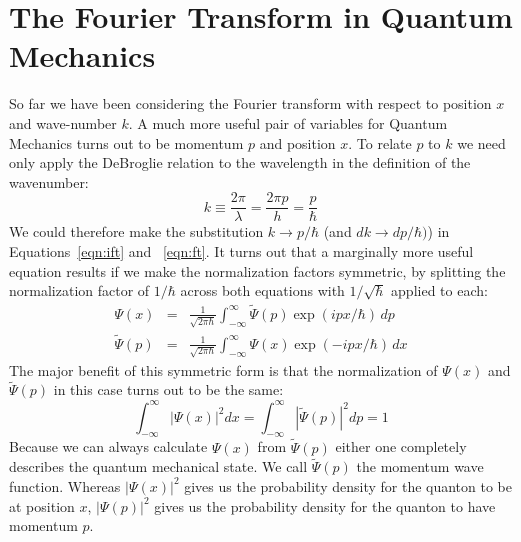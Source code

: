 \documentclass[12pt]{book}
\begin{document}
\section{The Fourier Transform in Quantum Mechanics}

So far we have been considering the Fourier transform with respect to position $x$ and wave-number $k$.  A much more useful pair of variables for Quantum Mechanics turns out to be momentum $p$ and position $x$.  To relate $p$ to $k$ we need only apply the DeBroglie relation to the wavelength in the definition of the wavenumber:
\begin{displaymath}
k \equiv \frac{2 \pi}{\lambda} = \frac{2 \pi p}{h} = \frac{p}{\hbar}
\end{displaymath}
We could therefore make the substitution $k \to p/\hbar$ (and $dk \to dp / \hbar)$) in Equations~\ref{eqn:ift} and ~\ref{eqn:ft}.  It turns out that a marginally more useful equation results if we make the normalization factors symmetric, by splitting the normalization factor of $1/\hbar$ across both equations with $1/\sqrt{\hbar}$ applied to each:
\begin{eqnarray} 
\Psi(x) &=& \frac{1}{\sqrt{2\pi\hbar}} \int_{-\infty}^{\infty} \widetilde{\Psi}(p) \exp(ipx/\hbar) \, dp \\
\widetilde{\Psi}(p) &=&  \frac{1}{\sqrt{2\pi\hbar}} \int_{-\infty}^{\infty} {\Psi}(x) \exp(-ipx/\hbar) \, dx
\end{eqnarray}
The major benefit of this symmetric form is that the normalization of $\Psi(x)$ and $\widetilde{\Psi}(p)$ in this case turns out to be the same:
\begin{displaymath}
\int_{-\infty}^{\infty} |\Psi(x)|^2 dx = \int_{-\infty}^{\infty} |\widetilde{\Psi}(p)|^2 dp = 1 
\end{displaymath}
Because we can always calculate $\Psi(x)$ from $\widetilde{\Psi}(p)$ either one completely describes the quantum mechanical state.  We call $\widetilde{\Psi}(p)$ the momentum wave function.   Whereas $|\Psi(x)|^2$ gives us the probability density for the quanton to be at position $x$, $|\Psi(p)|^2$ gives us the probability density for the quanton to have momentum $p$.
\end{document}
